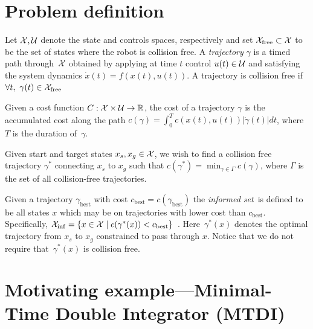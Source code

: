 \documentclass[letterpaper, 10 pt, conference]{ieeeconf}  %
\begin{document}
\section{Problem definition}
\label{sec:algorithm}
Let $\mathcal{X}, \mathcal{U}$ denote the state and controls spaces, respectively and set $\mathcal{X}_{\rm free} \subset \mathcal{X}$ to be the set of states where the robot is collision free.
A \emph{trajectory} $\gamma$ is a timed path through~$\mathcal{X}$ obtained by applying at time $t$ control $u(t) \in \mathcal{U}$ and satisfying the system dynamics 
$\dot{x}(t) = f( x(t) , u(t) )$.
A trajectory is collision free if $\forall t,~\gamma(t) \in \mathcal{X}_{\rm free}$

Given a cost function $C : \mathcal{X} \times \mathcal{U} \rightarrow \mathbb{R}$, the cost of a trajectory $ \gamma $ is the accumulated cost along the path
$c(\gamma) = \int_0^{T} c( x(t), u(t) ) |\dot{\gamma}(t)|dt$, 
where $T$ is the duration of~$\gamma$.

Given start and target states $x_s, x_g \in \mathcal{X}$, we wish to find a collision free trajectory $\gamma^*$ connecting $x_s$ to $x_g$ such that 
$c(\gamma^*) = \min_{\gamma \in \Gamma} c(\gamma)$, where $\Gamma$ is the set of all collision-free trajectories.

Given a trajectory $\gamma_{\text{best}}$ with cost $c_{\text{best}} = c(\gamma_{\text{best}})$ the \emph{informed set}~\Cinf is defined to be all states $x$  which may be on trajectories with lower cost than $c_{\text{best}}$.
Specifically,
$
\mathcal{X}_{\rm {inf}} = \{ x \in \mathcal{X} \mid  
		c ( \gamma^*(x) ) < c_{\rm best} \} $~\cite{GSB14}.
Here~$ \gamma^*(x) $ denotes the optimal trajectory  from $ x_s $ to $ x_g $ constrained to pass through $ x $.
Notice that we do not require that~$ \gamma^*(x) $ is collision free.


\section{Motivating example---Minimal-Time Double Integrator (MTDI)}
\label{sec:mtdi}
\end{document}

